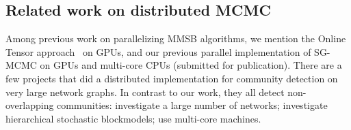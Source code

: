 \begin{comment}
Then we obtain the normalization term by $Z_{ab}^{(y)} = \sm{k}{K}f_{ab}^{(y)}(k)$. 
Integrating out the expectation in Eqn. \eqref{eqn:grad_local}, we obtain 
\bea
g_{ab}(\phi_{ak}) = \f{f_{ab}^{(y)}(k)}{Z_{ab}^{(y)}\phi_{ak}} - \f{1}{\phi_a}.
\eea 
Plugging this to Eqn. \ref{eqn:sgrld_update}, we obtain the SGRLD update rule for the local parameter $\phi_{ak}$
\bea
\phi_{ak}^* \law \left| \phi_{ak} + \f{\ep}{2} \left( \al - \phi_{ak} + \f{N}{|\cV_n|} \sum_{b \in \cV_n} g_{ab}(\phi_{ak})\right) \right. \nn \\ \left. + (\phi_{ak})^{\ha} \xi_{ak}\right|.\label{eqn:local_update}
\eea
Here, the $\cV_n$ is a random mini-batch of $n$ nodes sampled from $\cV^*$. Note that $|\cV_n| \ll |\cV^*|=N$.

\end{comment}

\subsection{Related work on distributed MCMC}

Among previous work on parallelizing MMSB algorithms, we mention the Online
Tensor approach~\cite{DBLP:journals/corr/HuangNHVA13} on GPUs, and our previous
parallel implementation of SG-MCMC on GPUs and multi-core CPUs (submitted for
publication). There are a few projects that did a distributed implementation
for community detection on very large network graphs. In contrast to our work,
they all detect non-overlapping communities: \cite{Bu2013246} investigate a
large number of networks; \cite{2015arXiv150302115L} investigate hierarchical
stochastic blockmodels; \cite{Prat-Perez:2014:HQS:2566486.2568010} use
multi-core machines.

\begin{comment}
In this paper, we describe our custom RDMA D-KV (Distributed Key-Value)
store. Current RMDA D-KV store implementations are RamCloud~\cite{RamCloud},
Pilaf~\cite{Pilaf}, Herd~\cite{Herd} and FaRM~\cite{FaRM}. All these systems
use RDMA to implement a D-KV store. However, all of them are far more powerful
than our custom implementation -- and this power comes at a cost that we
can avoid. They implement a generic D-KV store that controls concurrency,
supports dynamic inserts and deletes, supports variable-sized values
(whose size may change at an update), and keys of arbitrary type. Because
of the nature of our distributed algorithm, we have to deal with none of
these issues. For us, values are fixed-size, allocated only at the initial
population, and remain alive forever. We have no concurrency between writes
and reads or other writes. Our keys are a contiguous range of integers. All
these properties together allow an extremely low-overhead implementation
that does not involve the remote host in any transaction.
\end{comment}

